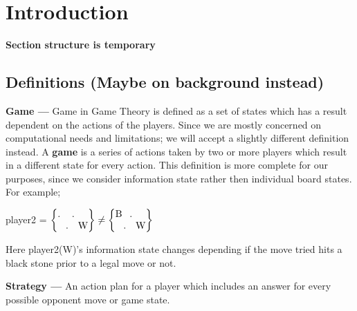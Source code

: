 \section{Introduction}

\textbf{Section structure is temporary}

\subsection{Definitions (Maybe on background instead)}

\textbf{Game ---} Game in Game Theory is defined as a set of states which has a result dependent on the actions of the players. Since we are mostly concerned on computational needs and limitations; we will accept a slightly different definition instead. A \textbf{game} is a series of actions taken by two or more players which result in a different state for every action. This definition is more complete for our purposes, since we consider information state rather then individual board states. For example;

\vspace{12px}
\centerline{player2 =
$\left\{
\begin{tabular}{@{}l@{}}
    . \hspace{3px} .\\
    \hspace{5px} . \hspace{1px} W
\end{tabular}
\right\}\neq
\left\{
\begin{tabular}{@{}l@{}}
    B \hspace{1px} .\\
    \hspace{5px} . \hspace{1px} W
\end{tabular}
\right\}$}

\vspace{12px}
Here player2(W)'s information state changes depending if the move tried hits a black stone prior to a legal move or not.

\vspace{14px}
\textbf{Strategy ---} An action plan for a player which includes an answer for every possible opponent move or game state.